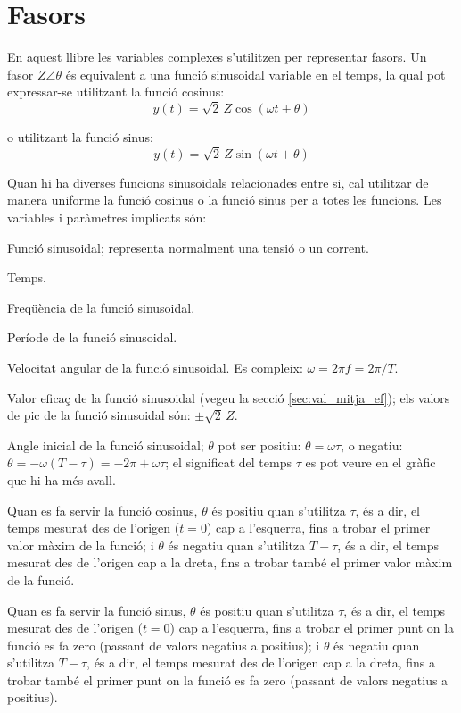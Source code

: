 \section*{Fasors}  \label{sec:fasors}

En aquest llibre les variables complexes s'utilitzen per representar fasors. Un fasor $Z\angle\theta$ és equivalent a una funció sinusoidal variable en el temps, la qual pot expressar-se utilitzant la funció cosinus:
\[y(t)=\sqrt{2}\, Z \cos(\omega t + \theta)\]

o utilitzant la funció sinus:
\[y(t)=\sqrt{2}\, Z \sin(\omega t + \theta)\]

Quan hi ha diverses funcions sinusoidals relacionades entre si, cal utilitzar de manera uniforme la funció cosinus o la funció sinus per a totes les funcions. Les variables i paràmetres implicats són:
\begin{list}{}
{\setlength{\labelwidth}{15mm} \setlength{\leftmargin}{20mm}
\setlength{\labelsep}{5mm}}
    \item[$y(t)$] Funció sinusoidal; representa normalment una tensió o un corrent.
    \item[$t$] Temps.
    \item[$f$] Freqüència de la funció sinusoidal.
    \item[$T$] Període de la funció sinusoidal.
    \item[$\omega$] Velocitat angular de la funció sinusoidal. Es compleix: $\omega = 2 \pi f = 2 \pi/T$.
    \item[$Z$] Valor eficaç de la funció sinusoidal (vegeu la secció \vref{sec:val_mitja_ef}); els valors de pic de la funció sinusoidal  són:  $\pm\sqrt{2}\, Z$.
    \item[$\theta$] Angle inicial de la funció sinusoidal;  $\theta$ pot ser positiu: $\theta=\omega \tau$, o negatiu: $\theta = -\omega (T-\tau) = -2\pi + \omega \tau$; el significat del temps $\tau$  es pot veure en el gràfic que hi ha més avall.

    Quan es fa servir la funció cosinus, $\theta$ és positiu quan s'utilitza $\tau$, és a dir, el temps mesurat  des de l'origen ($t=0$) cap a l'esquerra, fins a trobar el primer valor màxim de la funció; i $\theta$ és negatiu quan s'utilitza $T-\tau$, és a dir, el temps mesurat des de l'origen cap a la dreta, fins a trobar també el primer valor màxim de la funció.

    Quan es fa servir la funció sinus, $\theta$ és positiu quan s'utilitza $\tau$, és a dir, el temps mesurat des de l'origen ($t=0$) cap a l'esquerra, fins a trobar el primer punt on la funció es fa zero (passant de valors negatius a positius); i $\theta$ és negatiu quan s'utilitza $T-\tau$, és a dir, el temps mesurat des de l'origen cap a la dreta, fins a trobar també el primer punt on la funció es fa zero (passant de valors negatius a positius).
    \item[] 
\end{list}

